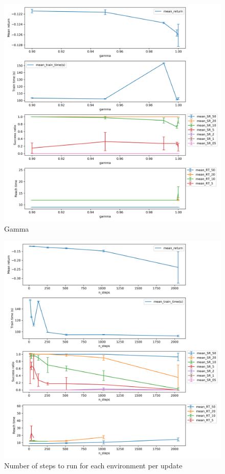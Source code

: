 \documentclass{article}
\begin{document}
\begin{figure}[H]
    \centering
    \includegraphics[width=\textwidth]{../ppo2_gamma.png}
\caption{Gamma}
\end{figure}

\begin{figure}[H]
    \centering
    \includegraphics[width=\textwidth]{../ppo2_n_steps.png}
\caption{Number of steps to run for each environment per update}
\end{figure}
\end{document}

